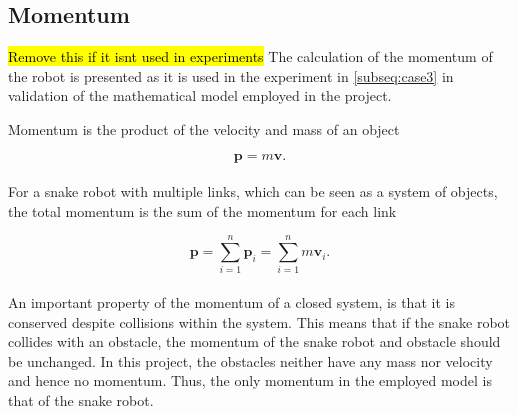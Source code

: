 \subsection{Momentum}\label{subseq:momentum}

\hl{Remove this if it isnt used in experiments} The calculation of the momentum of the robot is presented as it is used in the experiment in \ref{subseq:case3} in validation of the mathematical model employed in the project.

Momentum is the product of the velocity and mass of an object

\begin{equation}
    \mathbf{p} = m \mathbf{v}.
\end{equation}
\\
For a snake robot with multiple links, which can be seen as a system of objects, the total momentum is the sum of the momentum for each link

\begin{equation}\label{eq:momentum}
    \mathbf{p} = \sum_{i=1}^{n}\mathbf{p}_i = \sum_{i=1}^{n}m\mathbf{v}_i.
\end{equation}
\\
An important property of the momentum of a closed system, is that it is conserved despite collisions within the system. This means that if the snake robot collides with an obstacle, the momentum of the snake robot and obstacle should be unchanged. In this project, the obstacles neither have any mass nor velocity and hence no momentum. Thus, the only momentum in the employed model is that of the snake robot.
